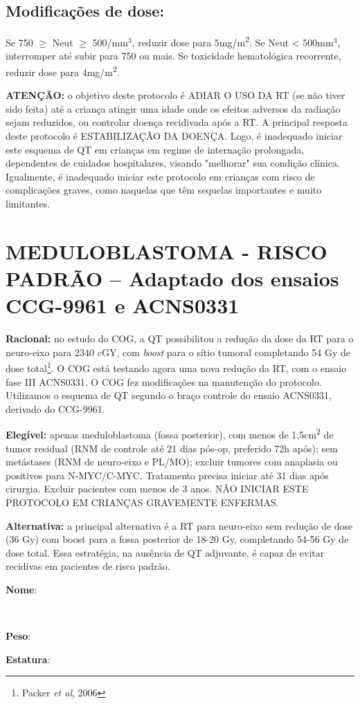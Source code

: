 \documentclass[11pt,a4paper,oldfontcommands]{memoir}
\def\entrywithlabel[#1]#2{\parbox{#1}{{\small #2:} \hrulefill}}
\begin{document}
\subsection{Modificações de dose:}
Se 750 $\geq$ Neut $\geq$ 500/mm\(^3\), reduzir dose para 5mg/m\textsuperscript{2}. Se Neut < 500mm\(^3\), interromper até subir para 750 ou mais. Se toxicidade hematológica recorrente, reduzir dose para 4mg/m\textsuperscript{2}.

\textbf{ATENÇÃO:} o objetivo deste protocolo é ADIAR O USO DA RT (se não tiver sido feita) até a criança atingir uma idade onde os efeitos adversos da radiação sejam reduzidos, ou controlar doença recidivada após a RT. A principal resposta deste protocolo é ESTABILIZAÇÃO DA DOENÇA. Logo, é inadequado iniciar este esquema de QT em crianças em regime de internação prolongada, dependentes de cuidados hospitalares, visando "melhorar" sua condição clínica. Igualmente, é inadequado iniciar este protocolo em crianças com risco de complicações graves, como naquelas que têm sequelas importantes e muito limitantes.

\cleardoublepage
\section{MEDULOBLASTOMA - RISCO PADRÃO -- Adaptado dos ensaios CCG-9961 e ACNS0331}
{\let\thefootnote\relax{}}
\textbf{Racional:} no estudo do COG, a QT possibilitou a redução da dose da RT para o neuro-eixo para 2340 cGY, com \textit{boost} para o sítio tumoral completando 54 Gy de dose total\footnote{Packer \textit{et al}, 2006}. O COG está testando agora uma nova redução da RT, com o ensaio fase III ACNS0331. O COG fez modificações na manutenção do protocolo. Utilizamos o esquema de QT segundo o braço controle do ensaio ACNS0331, derivado do CCG-9961.

\textbf{Elegível:} apenas meduloblastoma (fossa posterior), com menos de 1,5cm\textsuperscript{2} de tumor residual (RNM de controle até 21 dias pós-op, preferido 72h após); sem metástases (RNM de neuro-eixo e PL/MO); excluir tumores com anaplasia ou positivos para N-MYC/C-MYC. Tratamento precisa iniciar até 31 dias após cirurgia. Excluir pacientes com menos de 3 anos. NÃO INICIAR ESTE PROTOCOLO EM CRIANÇAS GRAVEMENTE ENFERMAS.

\textbf{Alternativa:} a principal alternativa é a RT para neuro-eixo sem redução de dose (36 Gy) com boost para a fossa posterior de 18-20 Gy, completando 54-56 Gy de dose total. Essa estratégia, na ausência de QT adjuvante, é capaz de evitar recidivas em pacientes de risco padrão.
\\[0.4cm]
\entrywithlabel[1\hsize]{\textbf{Nome}}\hfill
\\[0.3cm]
\entrywithlabel[.45\hsize]{\textbf{Peso}}\hfill  \entrywithlabel[.45\hsize]{\textbf{Estatura}}
\end{document}
